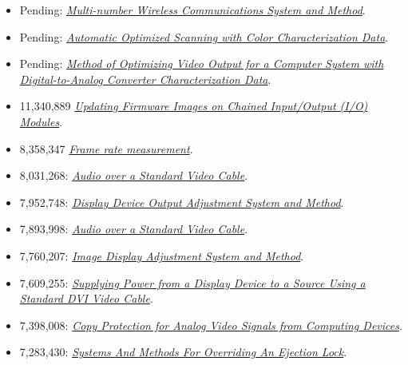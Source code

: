 \documentclass[10pt,letterpaper,oneside]{report}
\begin{document}
\begin{itemize}
  \item Pending: \href{http://voltz.us/resume/20070099638.pdf}
    {\textit{Multi-number Wireless Communications System and Method}}.

  \item Pending: \href{http://voltz.us/resume/20030123723.pdf}
    {\textit{Automatic Optimized Scanning with Color Characterization Data}}.

  \item Pending: \href{http://voltz.us/resume/20030122840.pdf}
    {\textit{Method of Optimizing Video Output for a Computer System with
    Digital-to-Analog Converter Characterization Data}}.

  \item 11,340,889 \href{http://voltz.us/resume/11_340_889.pdf}
    {\textit{Updating Firmware Images on Chained Input/Output (I/O) Modules}}.

  \item 8,358,347 \href{http://voltz.us/resume/8358347.pdf}
    {\textit{Frame rate measurement}}.

  \item 8,031,268: \href{http://voltz.us/resume/8031268.pdf}
    {\textit{Audio over a Standard Video Cable}}.

  \item 7,952,748: \href{http://voltz.us/resume/7952748.pdf}
    {\textit{Display Device Output Adjustment System and Method}}.

  \item 7,893,998: \href{http://voltz.us/resume/7893998.pdf}
    {\textit{Audio over a Standard Video Cable}}.

  \item 7,760,207: \href{http://voltz.us/resume/7760207.pdf}
    {\textit{Image Display Adjustment System and Method}}.

  \item 7,609,255: \href{http://voltz.us/resume/7609255.pdf}
    {\textit{Supplying Power from a Display Device to a Source Using a Standard
    DVI Video Cable}}.

  \item 7,398,008: \href{http://voltz.us/resume/7398008.pdf}
    {\textit{Copy Protection for Analog Video Signals from Computing Devices}}.

  \item 7,283,430: \href{http://voltz.us/resume/7283430.pdf}
    {\textit{Systems And Methods For Overriding An Ejection Lock}}.


\end{itemize}
\end{document}
